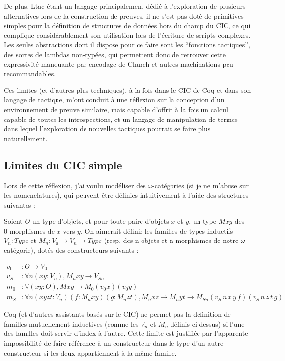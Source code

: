 \documentclass[]{article}
\begin{document}
De plus, Ltac étant un langage principalement dédié à l'exploration de
plusieurs alternatives lors de la construction de preuves, il ne s'est
pas doté de primitives simples pour la définition de structures de
données hors du champ du CIC, ce qui complique considérablement son
utilisation lors de l'écriture de scripts complexes. Les seules
abstractions dont il dispose pour ce faire sont les ``fonctions
tactiques'', des sortes de lambdas non-typées, qui permettent donc de
retrouver cette expressivité manquante par encodage de Church et autres
machinations peu recommandables.

Ces limites (et d'autres plus techniques), à la fois dans le CIC de Coq
et dans son langage de tactique, m'ont conduit à une réflexion sur la
conception d'un environnement de preuve similaire, mais capable d'offrir
à la fois un calcul capable de toutes les introspections, et un langage
de manipulation de termes dans lequel l'exploration de nouvelles
tactiques pourrait se faire plus naturellement.

\subsection{Limites du CIC simple}\label{limites-du-cic-simple}

Lors de cette réflexion, j'ai voulu modéliser des \(\omega\)-catégories
(si je ne m'abuse sur les nomenclatures), qui peuvent être définies
intuitivement à l'aide des structures suivantes :

Soient \(O\) un type d'objets, et pour toute paire d'objets \(x\) et
\(y\), un type \(M x y\) des 0-morphismes de \(x\) vers \(y\). On
aimerait définir les familles de types inductifs \(V_{n} : Type\) et
\(M_{n} : V_{n} \rightarrow V_{n} \rightarrow Type\) (resp. des n-objets
et n-morphismes de notre \(\omega\)-catégorie), dotés des constructeurs
suivants :

\begin{align*}
v_0 &: O \rightarrow V_{0} \\
v_S &: \forall n (x y : V_{n}), M_{n} x y \rightarrow V_{S n} \\
m_0 &: \forall (x y : O), M x y \rightarrow M_{0} (v_0 x) (v_0 y) \\
m_S &: \forall n (x y z t : V_{n}) (f : M_{n} x y) (g : M_{n} z t), M_{n} x z \rightarrow M_{n} y t \rightarrow M_{S n} (v_S\,n\,x\,y\,f) (v_S\,n\,z\,t\,g) 
\end{align*}

Coq (et d'autres assistants basés sur le CIC) ne permet pas la
définition de familles mutuellement inductives (comme les \(V_n\) et
\(M_n\) définis ci-dessus) si l'une des familles doit servir d'index à
l'autre. Cette limite est justifiée par l'apparente impossibilité de
faire référence à un constructeur dans le type d'un autre constructeur
si les deux appartiennent à la même famille.
\end{document}
